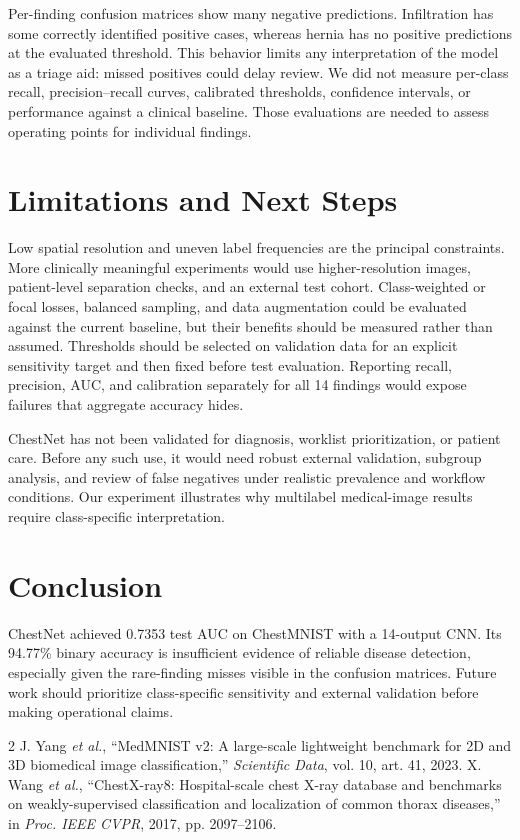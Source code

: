 \documentclass[conference]{IEEEtran}
\begin{document}
Per-finding confusion matrices show many negative predictions. Infiltration has some correctly identified positive cases, whereas hernia has no positive predictions at the evaluated threshold. This behavior limits any interpretation of the model as a triage aid: missed positives could delay review. We did not measure per-class recall, precision--recall curves, calibrated thresholds, confidence intervals, or performance against a clinical baseline. Those evaluations are needed to assess operating points for individual findings.

\balance
\section{Limitations and Next Steps}
Low spatial resolution and uneven label frequencies are the principal constraints. More clinically meaningful experiments would use higher-resolution images, patient-level separation checks, and an external test cohort. Class-weighted or focal losses, balanced sampling, and data augmentation could be evaluated against the current baseline, but their benefits should be measured rather than assumed. Thresholds should be selected on validation data for an explicit sensitivity target and then fixed before test evaluation. Reporting recall, precision, AUC, and calibration separately for all 14 findings would expose failures that aggregate accuracy hides.

ChestNet has not been validated for diagnosis, worklist prioritization, or patient care. Before any such use, it would need robust external validation, subgroup analysis, and review of false negatives under realistic prevalence and workflow conditions. Our experiment illustrates why multilabel medical-image results require class-specific interpretation.

\section{Conclusion}
ChestNet achieved 0.7353 test AUC on ChestMNIST with a 14-output CNN. Its 94.77\% binary accuracy is insufficient evidence of reliable disease detection, especially given the rare-finding misses visible in the confusion matrices. Future work should prioritize class-specific sensitivity and external validation before making operational claims.

\begin{thebibliography}{2}
 J. Yang \emph{et al.}, ``MedMNIST v2: A large-scale lightweight benchmark for 2D and 3D biomedical image classification,'' \emph{Scientific Data}, vol. 10, art. 41, 2023.
 X. Wang \emph{et al.}, ``ChestX-ray8: Hospital-scale chest X-ray database and benchmarks on weakly-supervised classification and localization of common thorax diseases,'' in \emph{Proc. IEEE CVPR}, 2017, pp. 2097--2106.
\end{thebibliography}
\end{document}
